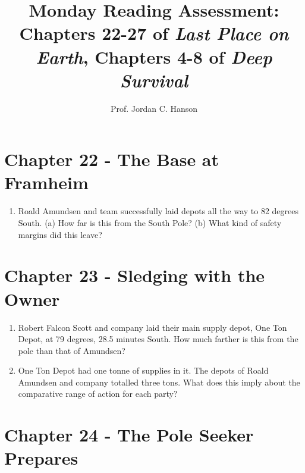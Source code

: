 \documentclass{article}
\begin{document}
\twocolumn

\title{Monday Reading Assessment: Chapters 22-27 of \textit{Last Place on Earth}, Chapters 4-8 of \textit{Deep Survival}}
\author{Prof. Jordan C. Hanson}

\maketitle


\section{Chapter 22 - The Base at Framheim}

\begin{enumerate}
\item Roald Amundsen and team successfully laid depots all the way to 82 degrees South.  (a) How far is this from the South Pole? (b) What kind of safety margins did this leave? \\ \vspace{2cm}
\end{enumerate}

\section{Chapter 23 - Sledging with the Owner}

\begin{enumerate}
\item Robert Falcon Scott and company laid their main supply depot, One Ton Depot, at 79 degrees, 28.5 minutes South.  How much farther is this from the pole than that of Amundsen? \\ \vspace{2cm}
\item One Ton Depot had one tonne of supplies in it.  The depots of Roald Amundsen and company totalled three tons.  What does this imply about the comparative range of action for each party? \\ \vspace{2cm}
\end{enumerate}

\section{Chapter 24 - The Pole Seeker Prepares}
\end{document}
